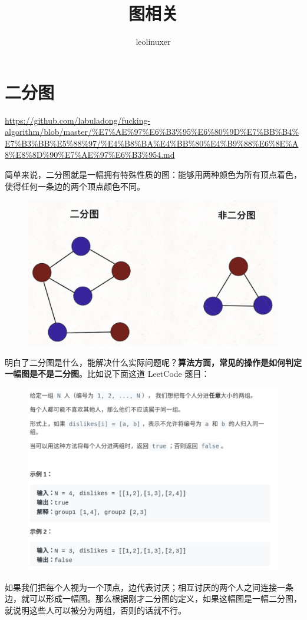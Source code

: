 \documentclass[12pt]{article}
\title{图相关}
\author{leolinuxer}
\begin{document}
\maketitle
\tableofcontents

\section{二分图}
\url{https://github.com/labuladong/fucking-algorithm/blob/master/%E7%AE%97%E6%B3%95%E6%80%9D%E7%BB%B4%E7%B3%BB%E5%88%97/%E4%B8%BA%E4%BB%80%E4%B9%88%E6%8E%A8%E8%8D%90%E7%AE%97%E6%B3%954.md}

简单来说，二分图就是一幅拥有特殊性质的图：能够用两种颜色为所有顶点着色，使得任何一条边的两个顶点颜色不同。
\begin{figure}[H]
    \centering
    \includegraphics[width=.5\textwidth]{fig/FA_BiGraph_1.png}
\end{figure}

明白了二分图是什么，能解决什么实际问题呢？\textbf{算法方面，常见的操作是如何判定一幅图是不是二分图}。比如说下面这道 LeetCode 题目：
\begin{figure}[H]
    \centering
    \includegraphics[width=.8\textwidth]{fig/FA_BiGraph_2.png}
\end{figure}

如果我们把每个人视为一个顶点，边代表讨厌；相互讨厌的两个人之间连接一条边，就可以形成一幅图。那么根据刚才二分图的定义，如果这幅图是一幅二分图，就说明这些人可以被分为两组，否则的话就不行。
\end{document}
